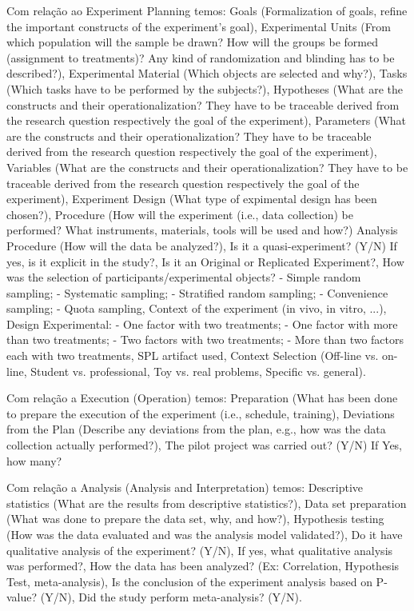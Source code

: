 Com relação ao Experiment Planning temos: Goals (Formalization of goals, refine the important constructs of the experiment's goal), Experimental Units (From which population will the sample be drawn? How will the groups be formed (assignment to treatments)? Any kind of randomization and blinding has to be described?), Experimental Material (Which objects are selected and why?), Tasks (Which tasks have to be performed by the subjects?), Hypotheses (What are the constructs and their operationalization? They have to be traceable derived from the research question respectively the goal of the experiment), Parameters (What are the constructs and their operationalization? They have to be traceable derived from the research question respectively the goal of the experiment), Variables (What are the constructs and their operationalization? They have to be traceable derived from the research question respectively the goal of the experiment), Experiment Design (What type of expimental design has been chosen?), Procedure (How will the experiment (i.e., data collection) be performed? What instruments, materials, tools will be used and how?) Analysis Procedure (How will the data be analyzed?), Is it a quasi-experiment? (Y/N) If yes, is it explicit in the study?, Is it an Original or Replicated Experiment?,	How was the selection of participants/experimental objects? - Simple random sampling; - Systematic sampling; - Stratified random sampling; - Convenience sampling; - Quota sampling, Context of the experiment (in vivo, in vitro, ...), Design Experimental: - One factor with two treatments; - One factor with more than two treatments; - Two factors with two treatments; - More than two factors each with two treatments, SPL artifact used, Context Selection (Off-line vs. on-line, Student vs. professional, Toy vs. real problems, Specific vs. general).

Com relação a Execution (Operation) temos: Preparation (What has been done to prepare the execution of the experiment (i.e., schedule, training), Deviations from the Plan (Describe any deviations from the plan, e.g., how was the data collection actually performed?), The pilot project was carried out? (Y/N) If Yes, how many?

Com relação a Analysis (Analysis and Interpretation) temos: Descriptive statistics (What are the results from descriptive statistics?), Data set preparation (What was done to prepare the data set, why, and how?), Hypothesis testing (How was the data evaluated and was the analysis model validated?), Do it have qualitative analysis of the experiment? (Y/N), If yes, what qualitative analysis was performed?, How the data has been analyzed? (Ex: Correlation, Hypothesis Test, meta-analysis), Is the conclusion of the experiment analysis based on P-value? (Y/N), Did the study perform meta-analysis? (Y/N).

